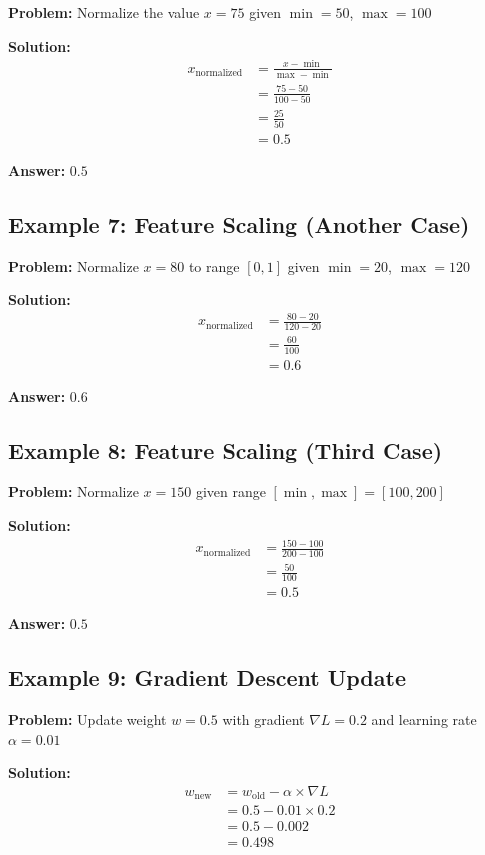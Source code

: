 \documentclass[11pt,a4paper]{article}
\begin{document}
\textbf{Problem:} Normalize the value $x = 75$ given $\min = 50$, $\max = 100$

\textbf{Solution:}
\begin{align}
    x_{\text{normalized}} &= \frac{x - \min}{\max - \min} \\
    &= \frac{75 - 50}{100 - 50} \\
    &= \frac{25}{50} \\
    &= 0.5
\end{align}

\textbf{Answer:} $0.5$

\subsection{Example 7: Feature Scaling (Another Case)}

\textbf{Problem:} Normalize $x = 80$ to range $[0, 1]$ given $\min = 20$, $\max = 120$

\textbf{Solution:}
\begin{align}
    x_{\text{normalized}} &= \frac{80 - 20}{120 - 20} \\
    &= \frac{60}{100} \\
    &= 0.6
\end{align}

\textbf{Answer:} $0.6$

\subsection{Example 8: Feature Scaling (Third Case)}

\textbf{Problem:} Normalize $x = 150$ given range $[\min, \max] = [100, 200]$

\textbf{Solution:}
\begin{align}
    x_{\text{normalized}} &= \frac{150 - 100}{200 - 100} \\
    &= \frac{50}{100} \\
    &= 0.5
\end{align}

\textbf{Answer:} $0.5$

\subsection{Example 9: Gradient Descent Update}

\textbf{Problem:} Update weight $w = 0.5$ with gradient $\nabla L = 0.2$ and learning rate $\alpha = 0.01$

\textbf{Solution:}
\begin{align}
    w_{\text{new}} &= w_{\text{old}} - \alpha \times \nabla L \\
    &= 0.5 - 0.01 \times 0.2 \\
    &= 0.5 - 0.002 \\
    &= 0.498
\end{align}
\end{document}
